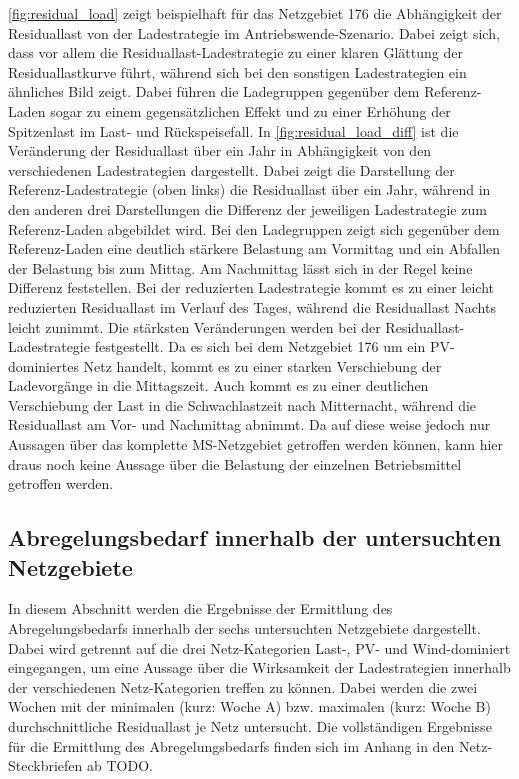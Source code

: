 \autoref{fig:residual_load} zeigt beispielhaft für das Netzgebiet \num{176} die Abhängigkeit der Residuallast von der Ladestrategie im Antriebswende-Szenario.
Dabei zeigt sich, dass vor allem die Residuallast-Ladestrategie zu einer klaren Glättung der Residuallastkurve führt, während sich bei den sonstigen Ladestrategien ein ähnliches Bild zeigt.
Dabei führen die Ladegruppen gegenüber dem Referenz-Laden sogar zu einem gegensätzlichen Effekt und zu einer Erhöhung der Spitzenlast im Last- und Rückspeisefall.
In \autoref{fig:residual_load_diff} ist die Veränderung der Residuallast über ein Jahr in Abhängigkeit von den verschiedenen Ladestrategien dargestellt.
Dabei zeigt die Darstellung der Referenz-Ladestrategie (oben links) die Residuallast über ein Jahr, während in den anderen drei Darstellungen die Differenz der jeweiligen Ladestrategie zum Referenz-Laden abgebildet wird.
Bei den Ladegruppen zeigt sich gegenüber dem Referenz-Laden eine deutlich stärkere Belastung am Vormittag und ein Abfallen der Belastung bis zum Mittag.
Am Nachmittag lässt sich in der Regel keine Differenz feststellen.
Bei der reduzierten Ladestrategie kommt es zu einer leicht reduzierten Residuallast im Verlauf des Tages, während die Residuallast Nachts leicht zunimmt.
Die stärksten Veränderungen werden bei der Residuallast-Ladestrategie festgestellt.
Da es sich bei dem Netzgebiet \num{176} um ein \gls{PV}-dominiertes Netz handelt, kommt es zu einer starken Verschiebung der Ladevorgänge in die Mittagszeit.
Auch kommt es zu einer deutlichen Verschiebung der Last in die Schwachlastzeit nach Mitternacht, während die Residuallast am Vor- und Nachmittag abnimmt.
Da auf diese weise jedoch nur Aussagen über das komplette \gls{MS}-Netzgebiet getroffen werden können, kann hier draus noch keine Aussage über die Belastung der einzelnen Betriebsmittel getroffen werden.





\subsection{Abregelungsbedarf innerhalb der untersuchten Netzgebiete}

In diesem Abschnitt werden die Ergebnisse der Ermittlung des Abregelungsbedarfs innerhalb der sechs untersuchten Netzgebiete dargestellt.
Dabei wird getrennt auf die drei Netz-Kategorien Last-, \gls{PV}- und Wind-dominiert eingegangen, um eine Aussage über die Wirksamkeit der Ladestrategien innerhalb der verschiedenen Netz-Kategorien treffen zu können.
Dabei werden die zwei Wochen mit der minimalen (kurz: Woche A) bzw. maximalen (kurz: Woche B) durchschnittliche Residuallast je Netz untersucht.
Die vollständigen Ergebnisse für die Ermittlung des Abregelungsbedarfs finden sich im Anhang in den Netz-Steckbriefen ab {\color{red} TODO}.

